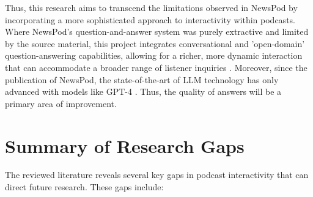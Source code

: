 \documentclass[12pt]{report}
\begin{document}
\begin{myfont}
        \indent Thus, this research aims to transcend the limitations observed in NewsPod by incorporating a more sophisticated approach to interactivity within podcasts. Where NewsPod's question-and-answer system was purely extractive and limited by the source material, this project integrates conversational and 'open-domain' question-answering capabilities, allowing for a richer, more dynamic interaction that can accommodate a broader range of listener inquiries \citep{Laban2022NewsPod}. Moreover, since the publication of NewsPod, the state-of-the-art of LLM technology has only advanced with models like GPT-4 \citep{OpenAI2023GPT4}. Thus, the quality of answers will be a primary area of improvement.
        
        \section{Summary of Research Gaps}
        \indent The reviewed literature reveals several key gaps in podcast interactivity that can direct future research. These gaps include: 


\end{myfont}
\end{document}
